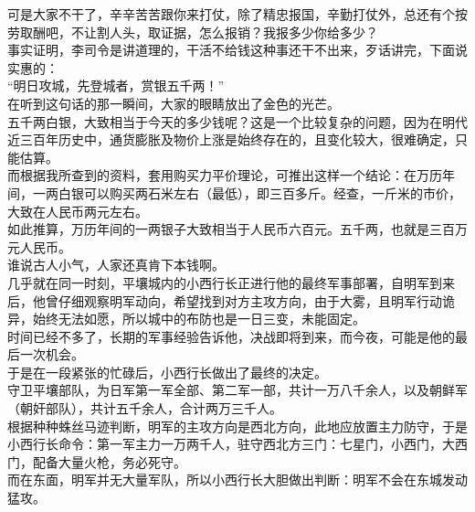 \begin{multicols}{\theparacolNo}
可是大家不干了，辛辛苦苦跟你来打仗，除了精忠报国，辛勤打仗外，总还有个按劳取酬吧，不让割人头，取证据，怎么报销？我报多少你给多少？\\

事实证明，李司令是讲道理的，干活不给钱这种事还干不出来，歹话讲完，下面说实惠的：\\

“明日攻城，先登城者，赏银五千两！”\\

在听到这句话的那一瞬间，大家的眼睛放出了金色的光芒。\\

五千两白银，大致相当于今天的多少钱呢？这是一个比较复杂的问题，因为在明代近三百年历史中，通货膨胀及物价上涨是始终存在的，且变化较大，很难确定，只能估算。\\

而根据我所查到的资料，套用购买力平价理论，可推出这样一个结论：在万历年间，一两白银可以购买两石米左右（最低），即三百多斤。经查，一斤米的市价，大致在人民币两元左右。\\

如此推算，万历年间的一两银子大致相当于人民币六百元。五千两，也就是三百万元人民币。\\

谁说古人小气，人家还真肯下本钱啊。\\

几乎就在同一时刻，平壤城内的小西行长正进行他的最终军事部署，自明军到来后，他曾仔细观察明军动向，希望找到对方主攻方向，由于大雾，且明军行动诡异，始终无法如愿，所以城中的布防也是一日三变，未能固定。\\

时间已经不多了，长期的军事经验告诉他，决战即将到来，而今夜，可能是他的最后一次机会。\\

于是在一段紧张的忙碌后，小西行长做出了最终的决定。\\

守卫平壤部队，为日军第一军全部、第二军一部，共计一万八千余人，以及朝鲜军（朝奸部队），共计五千余人，合计两万三千人。\\

根据种种蛛丝马迹判断，明军的主攻方向是西北方向，此地应放置主力防守，于是小西行长命令：第一军主力一万两千人，驻守西北方三门：七星门，小西门，大西门，配备大量火枪，务必死守。\\

而在东面，明军并无大量军队，所以小西行长大胆做出判断：明军不会在东城发动猛攻。\\


\end{multicols}
